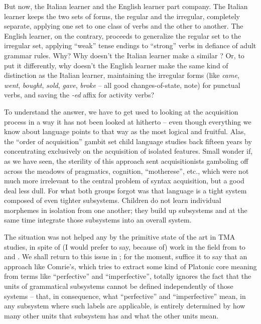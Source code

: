 But now, the Italian learner and the English learner part company. The Italian learner keeps the two sets of forms, the regular and the irregular, completely separate, applying one set to one class of verbs and the other to another. The English learner, on the contrary, proceeds to generalize the regular set to the irregular set, applying ``weak'' tense endings to ``strong'' verbs in defiance of adult grammar rules. Why? Why doesn't the Italian learner make a similar ? Or, to put it differently, why doesn't the English learner make the same kind of distinction as the Italian learner, maintaining the irregular forms (like \textit{came}, \textit{went}, \textit{bought}, \textit{sold}, \textit{gave}, \textit{broke} -- all good changes-of-state, note) for punctual verbs, and saving the \textit{-ed}\label{edaffix} affix for activity verbs?

To understand the answer, we have to get used to looking at the
acquisition process in a way it has not been looked at hitherto -- even though everything we know about language points to that way as the most logical and fruitful. Alas, the ``order of acquisition'' gambit set child language studies back fifteen years by concentrating exclusively on the acquisition of isolated features. Small wonder if, as we have seen, the sterility of this approach sent acquisitionists gamboling off across the meadows of pragmatics, cognition, ``motherese'', etc., which were not much more irrelevant to the central problem of syntax acquisition, but a good deal less dull. For what both groups forgot was that language is a tight system composed of even tighter subsystems. Children do not learn individual morphemes in isolation from one another; they build up subsystems and at the same time integrate those subsystems into an overall system.

The situation was not helped any by the primitive state of the art in TMA studies, in spite of (I would prefer to say, because of) work in the field from \citet{Reichenbach1947} to \citet{Comrie1976} and \citet{Woisetschlaeger1977}. We shall return to this issue in ; for the moment, suffice it to say that an approach like Comrie's, which tries to extract some kind of Platonic core meaning from terms like ``perfective'' and ``imperfective'', totally ignores the fact that the units of grammatical subsystems cannot be defined independently of those systems -- that, in consequence, what ``perfective'' and ``imperfective'' mean, in any subsystem where such labels are applicable, is entirely determined by how many other units that subsystem has and what the other units mean.\\\\

